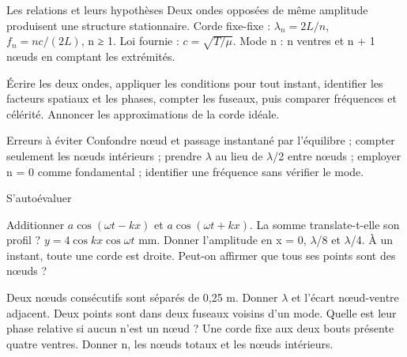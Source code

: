 \begin{loi}{Les relations et leurs hypothèses}
Deux ondes opposées de même amplitude produisent une structure stationnaire. Corde fixe-fixe : $\lambda_n=2L/n$, $f_n=nc/(2L)$, n ≥ 1. Loi fournie : $c=\sqrt{T/\mu}$. Mode n : n ventres et n + 1 nœuds en comptant les extrémités.
\end{loi}
Écrire les deux ondes, appliquer les conditions pour tout instant, identifier les facteurs spatiaux et les phases, compter les fuseaux, puis comparer fréquences et célérité. Annoncer les approximations de la corde idéale.
\begin{piege}{Erreurs à éviter}
Confondre nœud et passage instantané par l’équilibre ; compter seulement les nœuds intérieurs ; prendre \ensuremath{\lambda} au lieu de \ensuremath{\lambda}/2 entre nœuds ; employer n = 0 comme fondamental ; identifier une fréquence sans vérifier le mode.
\end{piege}
\begin{docu}{S’autoévaluer}
\end{docu}


Additionner $a\cos(\omega t-kx)$ et $a\cos(\omega t+kx)$. La somme translate-t-elle son profil ?
$y=4\cos kx\cos\omega t$ mm. Donner l’amplitude en x = 0, \ensuremath{\lambda}/8 et \ensuremath{\lambda}/4.
À un instant, toute une corde est droite. Peut-on affirmer que tous ses points sont des nœuds ?


Deux nœuds consécutifs sont séparés de 0,25 m. Donner \ensuremath{\lambda} et l’écart nœud-ventre adjacent.
Deux points sont dans deux fuseaux voisins d’un mode. Quelle est leur phase relative si aucun n’est un nœud ?
Une corde fixe aux deux bouts présente quatre ventres. Donner n, les nœuds totaux et les nœuds intérieurs.


